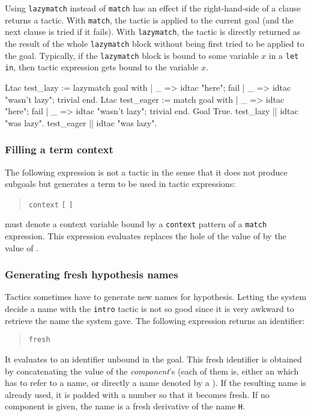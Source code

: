 \variant
{}
Using {\tt lazymatch} instead of {\tt match} has an effect if the
right-hand-side of a clause returns a tactic. With {\tt match}, the
tactic is applied to the current goal (and the next clause is tried if
it fails). With {\tt lazymatch}, the tactic is directly returned as
the result of the whole {\tt lazymatch} block without being first
tried to be applied to the goal. Typically, if the {\tt lazymatch}
block is bound to some variable $x$ in a {\tt let in}, then tactic
expression gets bound to the variable $x$.

\begin{coq_example}
Ltac test_lazy :=
  lazymatch goal with
  | _ => idtac "here"; fail 
  | _ => idtac "wasn't lazy"; trivial
  end.
Ltac test_eager :=
  match goal with
  | _ => idtac "here"; fail 
  | _ => idtac "wasn't lazy"; trivial
  end.
Goal True.
test_lazy || idtac "was lazy".
test_eager || idtac "was lazy".
\end{coq_example}

\subsubsection[Filling a term context]{Filling a term context}

The following expression is not a tactic in the sense that it does not
produce subgoals but generates a term to be used in tactic
expressions:
\begin{quote}
{\tt context} {\ident} {\tt [} {\tacexpr} {\tt ]}
\end{quote}
{\ident} must denote a context variable bound by a {\tt context}
pattern of a {\tt match} expression. This expression evaluates
replaces the hole of the value of {\ident} by the value of
{\tacexpr}.

\ErrMsg {}


\subsubsection[Generating fresh hypothesis names]{Generating fresh hypothesis names
}

Tactics sometimes have to generate new names for hypothesis. Letting
the system decide a name with the {\tt intro} tactic is not so good
since it is very awkward to retrieve the name the system gave.
The following expression returns an identifier:
\begin{quote}
{\tt fresh} 
\end{quote}
It evaluates to an identifier unbound in the goal. This fresh
identifier is obtained by concatenating the value of the
\textrm{\textsl{component}}'s (each of them is, either an {\ident} which
has to refer to a name, or directly a name denoted by a
{\qstring}). If the resulting name is already used, it is padded
with a number so that it becomes fresh. If no component is
given, the name is a fresh derivative of the name {\tt H}.

